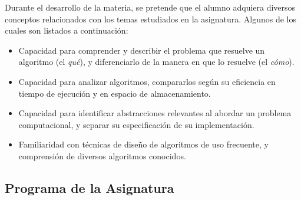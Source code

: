 Durante el desarrollo de la materia, se pretende que el alumno adquiera diversos conceptos relacionados con los temas estudiados en la asignatura.
Algunos de los cuales son listados a continuación:
\begin{itemize}
    \item Capacidad para comprender y describir el problema que resuelve un algoritmo (el \textit{qué}), y diferenciarlo de la manera en que lo resuelve (el \textit{cómo}).
    \item Capacidad para analizar algoritmos, compararlos según su eficiencia en tiempo de ejecución y en espacio de almacenamiento.
    \item Capacidad para identificar abstracciones relevantes al abordar un problema computacional, y separar su especificación de su implementación.
    \item Familiaridad con técnicas de diseño de algoritmos de uso frecuente, y comprensión de diversos algoritmos conocidos.
\end{itemize}

\subsection{Programa de la Asignatura}

